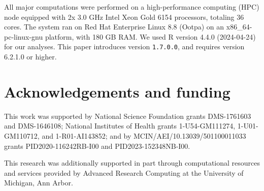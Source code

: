 All major computations were performed on a high-performance computing (HPC) node equipped with 2x 3.0 GHz Intel Xeon Gold 6154 processors, totaling 36 cores. The system ran on Red Hat Enterprise Linux 8.8 (Ootpa) on an x86\_64-pc-linux-gnu platform, with 180 GB RAM.
We used R version 4.4.0 (2024-04-24) for our analyses.
This paper introduces  version \texttt{1.7.0.0}, and requires  version 6.2.1.0 or higher.

\section{Acknowledgements and funding}\label{acknowledgements-and-funding}

This work was supported by National Science Foundation grants DMS-1761603 and DMS-1646108; National Institutes of Health grants 1-U54-GM111274, 1-U01-GM110712, and 1-R01-AI143852; and by MCIN/AEI/10.13039/501100011033 grants PID2020-116242RB-I00 and PID2023-152348NB-I00.

This research was additionally supported in part through computational resources and services provided by Advanced Research Computing at the University of Michigan, Ann Arbor.



\address{%
Carles Bretó\\
Universitat de València\\%
Department of Economic Analysis\\ Valencia, Spain\\
%
%
\textit{ORCiD: \href{https://orcid.org/0000-0003-4695-4902}{0000-0003-4695-4902}}\\%
\href{mailto:carles.breto@uv.es}{\nolinkurl{carles.breto@uv.es}}%
}

\address{%
Jesse Wheeler\\
University of Michigan\\%
Department of Statistics\\ Ann Arbor, Michigan\\
%
%
\textit{ORCiD: \href{https://orcid.org/0000-0003-3941-3884}{0000-0003-3941-3884}}\\%
\href{mailto:jeswheel@umich.edu}{\nolinkurl{jeswheel@umich.edu}}%
}

\address{%
Aaron A. King\\
University of Michigan and Santa Fe Institute\\%
Department of Ecology and Evolutionary Biology\\ Ann Arbor, Michigan\\
%
%
\textit{ORCiD: \href{https://orcid.org/0000-0001-6159-3207}{0000-0001-6159-3207}}\\%
\href{mailto:kingaa@umich.edu}{\nolinkurl{kingaa@umich.edu}}%
}

\address{%
Edward L. Ionides\\
University of Michigan\\%
Department of Statistics\\ Ann Arbor, Michigan\\
%
%
\textit{ORCiD: \href{https://orcid.org/0000-0002-4190-0174}{0000-0002-4190-0174}}\\%
\href{mailto:ionides@umich.edu}{\nolinkurl{ionides@umich.edu}}%
}
